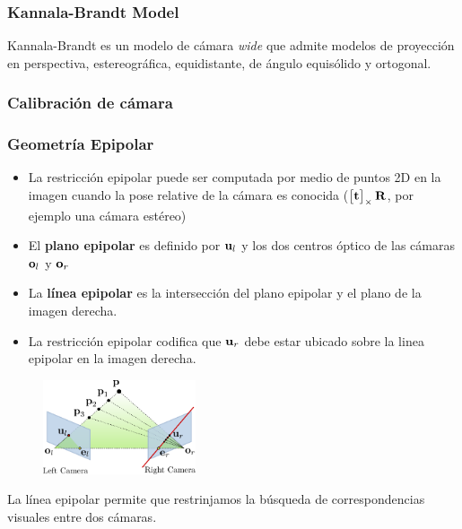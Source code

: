 \begin{frame}
    \frametitle{Kannala-Brandt Model}
    Kannala-Brandt es un modelo de cámara \emph{wide} que admite modelos de proyección en perspectiva, estereográfica, equidistante, de ángulo equisólido y ortogonal.


\end{frame}

\begin{frame}
    \frametitle{Calibración de cámara}
    \footnotesize
    
    
\end{frame}


\begin{frame}
    \frametitle{Geometría Epipolar}
    \footnotesize

    \begin{itemize}
        \item La restricción epipolar puede ser computada por medio de puntos 2D en la imagen cuando la pose relative de la cámara es conocida ($\begin{bmatrix}
            \boldsymbol{\mathbf{t}} 
        \end{bmatrix}_{\times} \boldsymbol{\mathbf{R}}$, por ejemplo una cámara estéreo)
        \item El \textbf{plano epipolar} es definido por $\boldsymbol{\mathbf{u}}_{l}$ y los dos centros óptico de las cámaras $\boldsymbol{\mathbf{o}}_{l}$ y $\boldsymbol{\mathbf{o}}_{r}$
        \item La \textbf{línea epipolar} es la intersección del plano epipolar y el plano de la imagen derecha.
        \item La restricción epipolar codifica que $\boldsymbol{\mathbf{u}}_{r}$ debe estar ubicado sobre la linea epipolar en la imagen derecha.
    \end{itemize}

    \begin{figure}
        \includegraphics[width=0.4\textwidth]{./images/epipolar_geometry.pdf}
    \end{figure}

    La línea epipolar permite que restrinjamos la búsqueda de correspondencias visuales entre dos cámaras.
\end{frame}

